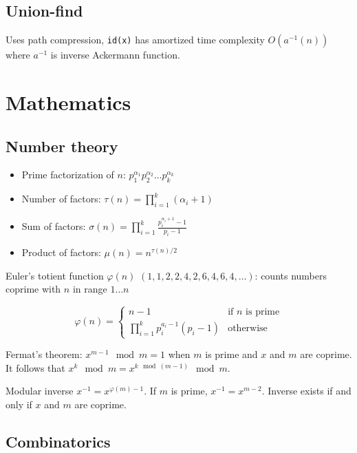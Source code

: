 \documentclass{article}
\begin{document}


\subsection{Union-find}

Uses path compression, \texttt{id(x)} has amortized time complexity $O(a^{-1}(n))$ where $a^{-1}$ is inverse Ackermann function.



\section {Mathematics}

\subsection {Number theory}

\begin{itemize}
	\item Prime factorization of $n$: $p_1^{\alpha_1}p_2^{\alpha_2} \dots p_k^{\alpha_k}$
	\item Number of factors: $\tau(n) = \prod_{i=1}^{k} (\alpha_i+1)$
	\item Sum of factors: $\sigma(n) = \prod_{i=1}^{k} \frac{p_i^{\alpha_i+1}-1}{p_i-1}$
	\item Product of factors: $\mu(n) = n^{\tau(n)/2}$
\end{itemize}

Euler's totient function $\varphi(n)$ $(1, 1, 2, 2, 4, 2, 6, 4, 6, 4, \dots)$: counts numbers coprime with $n$ in range $1 \dots n$

\[
	\varphi(n) =
	\begin{cases}
		n-1 &\text{if $n$ is prime} \\
		\prod_{i=1}^{k} p_i^{a_i-1}(p_i-1) &\text{otherwise}
	\end{cases}
\]

Fermat's theorem: $x^{m-1} \mod m = 1$ when $m$ is prime and $x$ and $m$ are coprime. It follows that $x^k \mod m = x^{k \mod (m-1)} \mod m$.

Modular inverse $x^{-1} = x^{\varphi(m)-1}$. If $m$ is prime, $x^{-1} = x^{m-2}$. Inverse exists if and only if $x$ and $m$ are coprime.

\subsection {Combinatorics}
\end{document}
